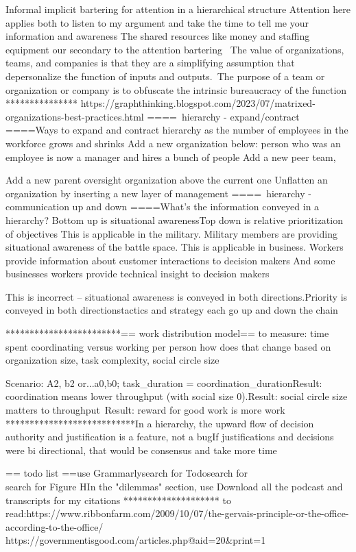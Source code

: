 
Informal implicit bartering for attention in a hierarchical structure
Attention here applies both to listen to my argument and take the time to tell me your information and awareness
The shared resources like money and staffing equipment our secondary to the attention bartering 
The value of organizations, teams, and companies is that they are a simplifying assumption that depersonalize the function of inputs and outputs. The purpose of a team or organization or company is to obfuscate the intrinsic bureaucracy of the function
***************
https://graphthinking.blogspot.com/2023/07/matrixed-organizations-best-practices.html
==== hierarchy - expand/contract ====Ways to expand and contract hierarchy as the number of employees in the workforce grows and shrinks
Add a new organization below: person who was an employee is now a manager and hires a bunch of people
Add a new peer team,

Add a new parent oversight organization above the current one
Unflatten an organization by inserting a new layer of management
==== hierarchy - communication up and down ====What's the information conveyed in a hierarchy?
Bottom up is situational awarenessTop down is relative prioritization of objectives
This is applicable in the military. Military members are providing situational awareness of the battle space.
This is applicable in business. Workers provide information about customer interactions to decision makers
And some businesses workers provide technical insight to decision makers

This is incorrect -- situational awareness is conveyed in both directions.Priority is conveyed in both directionstactics and strategy each go up and down the chain

************************== work distribution model==
to measure: time spent coordinating versus working per person
how does that change based on organization size, task complexity, social circle size

Scenario: A2, b2 or...a0,b0; task_duration = coordination_durationResult: coordination means lower throughput (with social size 0).Result: social circle size matters to throughput Result: reward for good work is more work 
***************************In a hierarchy, the upward flow of decision authority and justification is a feature, not a bugIf justifications and decisions were bi directional, that would be consensus and take more time

== todo list ==use Grammarlysearch for Todosearch for \ \\search for Figure HIn the "dilemmas" section, use \iftoggle{boundbook}{ (\ref{})}{}
Download all the podcast and transcripts for my citations
********************
to read:https://www.ribbonfarm.com/2009/10/07/the-gervais-principle-or-the-office-according-to-the-office/
https://governmentisgood.com/articles.php@aid=20&print=1

